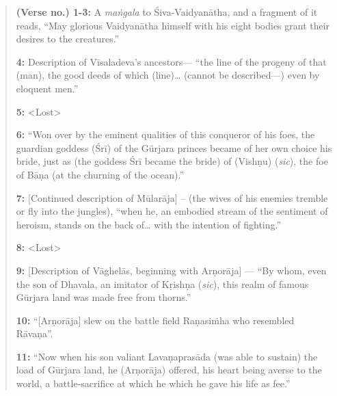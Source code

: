 \begin{quote}
{\bf (Verse no.) 1-3:} A {\sl maṅgala} to Śiva-Vaidyanātha, and a fragment of it reads, “May glorious Vaidyanātha himself with his eight bodies grant their desires to the creatures.”


{\bf 4:} Description of Vīsaladeva’s ancestors— “the line of the progeny of that (man), the good deeds of which (line)… (cannot be described—) even by eloquent men.”


{\bf 5:} <Lost>

\smallskip
{\bf 6:} “Won over by the eminent qualities of this conqueror of his foes, the guardian goddess (Śrī) of the Gūrjara princes became of her own choice his bride, just as (the goddess Śrī became the bride) of (Vishṇu) ({\sl sic}), the foe of Bāṇa (at the churning of the ocean).” 

\smallskip
{\bf 7:} [Continued description of Mūlarāja] – (the wives of his enemies tremble or fly into the jungles), “when he, an embodied stream of the sentiment of heroism, stands on the back of… with the intention of fighting.”

\smallskip
{\bf 8:} <Lost>

\smallskip
{\bf 9:} [Description of Vāghelās, beginning with Arṇorāja] — “By whom, even the son of Dhavala, an imitator of Kṛishṇa ({\sl sic}), this realm of famous Gūrjara land was made free from thorns.”

\smallskip
{\bf 10:} “[Arṇorāja] slew on the battle field Raṇasiṁha who resembled Rāvaṇa”.

\smallskip
{\bf 11:} “Now when his son valiant Lavaṇaprasāda (was able to sustain) the load of Gūrjara land, he (Arṇorāja) offered, his heart being averse to the world, a battle-sacrifice at which he which he gave his life as fee.”


\end{quote}
